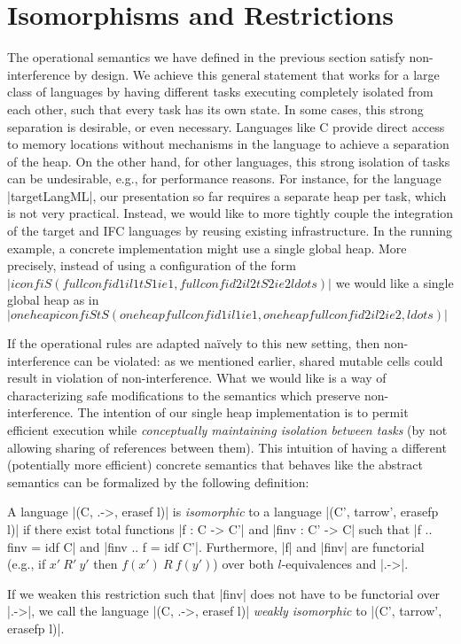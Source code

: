 \section{Isomorphisms and Restrictions}
\label{sec:concrete}

\newcommand{\con}[1]{\ensuremath{{\color{red} #1}}}
\newcommand{\abs}[1]{\ensuremath{{\color{blue} #1}}}

The operational semantics we have defined in the previous section
satisfy non-interference by design.
We achieve this general statement that works for a large class of
languages by having different tasks executing completely isolated from
each other, such that every task has its own state.
In some cases, this strong separation is desirable, or even necessary.
Languages like C provide direct access to memory locations without
mechanisms in the language to achieve a separation of the heap.
On the other hand, for other languages, this
strong isolation of tasks can be
undesirable, e.g., for performance reasons.
For instance, for the language |targetLangML|, our presentation so far
requires a separate heap per task, which is not very practical.
Instead, we would like to
more tightly couple the integration of the target and IFC
languages by reusing existing infrastructure.  In the running example,
a concrete implementation might use a single global heap.
More precisely, instead of using a configuration of the form
$|iconf iS (fullconf id1 il1 tS1 ie1, fullconf id2 il2 tS2 ie2 ldots)|$
we would like a single global heap as in
$|oneheapiconf iS tS (oneheapfullconf id1 il1 ie1, oneheapfullconf id2 il2 ie2, ldots)|$

If the operational rules are adapted na\"ively to this new setting,
then non-interference can be violated: as we mentioned earlier,
shared mutable cells could result in violation of non-interference.
What we would like is a way of characterizing safe modifications to
the semantics which preserve non-interference.
The intention of our single heap implementation is to permit
efficient execution while \emph{conceptually maintaining isolation between
tasks} (by not allowing sharing of references between them).
This intuition of having a different (potentially more efficient)
concrete semantics that behaves like the abstract semantics
can be formalized by the following definition:


\begin{definition}
  A language |(C, .->, erasef l)| is \textit{isomorphic} to a
  language |(C', tarrow', erasefp l)| if there exist total functions |f
  : C -> C'| and |finv : C' -> C| such that |f .. finv = idf C| and |finv
  .. f = idf C'|.  Furthermore, |f| and |finv| are functorial (e.g., if
  $x'\ R'\ y'$ then $f(x')\ R\ f(y')$) over both
  $l$-equivalences and |.->|.

  If we weaken this restriction such that |finv| does
  not have to be functorial over |.->|, we call the
  language |(C, .->, erasef l)| \textit{weakly isomorphic} to
  |(C', tarrow', erasefp l)|.
\end{definition}

